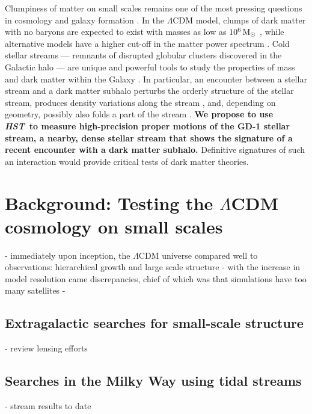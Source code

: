 \documentclass[12pt]{article}
\newcommand{\hst}{\textsl{HST}}
\begin{document}
%
%
\justification          %
\vspace{-0.5cm}

Clumpiness of matter on small scales remains one of the most pressing questions in cosmology and galaxy formation \parencite{bullock2017}.
In the $\Lambda$CDM model, clumps of dark matter with no baryons are expected to exist with masses as low as $10^{6}\rm\,M_\odot$ \parencite{springel2008}, while alternative models have a higher cut-off in the matter power spectrum \parencite[e.g.,][]{bode2001,hu2000}.
Cold stellar streams --- remnants of disrupted globular clusters discovered in the Galactic halo \parencite{gc2016} --- are unique and powerful tools to study the properties of mass and dark matter within the Galaxy \parencite[e.g.,][]{bonaca2018}.
In particular, an encounter between a stellar stream and a dark matter subhalo perturbs the orderly structure of the stellar stream, produces density variations along the stream \parencite[e.g.,][]{carlberg2012}, and, depending on geometry, possibly also folds a part of the stream \parencite[e.g.,][]{yoon2011}.
{\bf We propose to use \hst\ to measure high-precision proper motions of the GD-1 stellar stream, a nearby, dense stellar stream that shows the signature of a recent encounter with a dark matter subhalo.}
Definitive signatures of such an interaction would provide critical tests of dark matter theories.

\section*{Background: Testing the $\Lambda$CDM cosmology on small scales}
- immediately upon inception, the $\Lambda$CDM universe compared well to observations: hierarchical growth and large scale structure
- with the increase in model resolution came discrepancies, chief of which was that simulations have too many satellites
- 

\subsection*{Extragalactic searches for small-scale structure}
- review lensing efforts

\subsection*{Searches in the Milky Way using tidal streams}
- stream results to date
\end{document}
